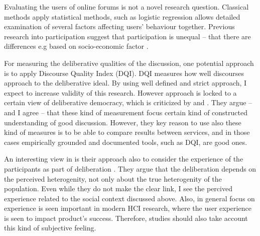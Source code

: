 \documentclass{article}
\begin{document}
Evaluating the users of online forums is not a novel research question. Classical methods apply statistical methods, such as logistic regression allows detailed examination of several factors affecting users' behaviour together. Previous research into participation suggest that participation is unequal -- that there are differences e.g  based on socio-economic factor .

For measuring the deliberative qualities of the discussion, one potential approach is to apply  Discourse Quality Index (DQI). DQI measures how well discourses approach to the deliberative ideal. By using well defined and strict approach, I expect to increase validity of this research. However  approach is locked to a certain view of deliberative democracy, which is criticized by  and . They argue -- and I agree -- that these kind of measurement focus certain kind of constructed understanding of good discussion. However, they key reason to use also these kind of measures is to be able to compare results between services, and in those cases empirically grounded and documented tools, such as DQI, are good ones.

An interesting view in  is their approach also to consider the experience of the participants as part of deliberation . They argue that the deliberation depends on the perceived heterogenity, not only about the true heterogenity of the population. Even while they do not make the clear link, I see the percived experience related to the social context discussed above. Also, in general focus on experience is seen important in modern HCI research, where the user experience is seen to impact product's success. Therefore, studies should also take account this kind of subjective feeling.



\end{document}
